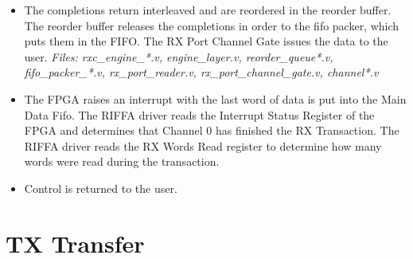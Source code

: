 \documentclass{refrep}
\begin{document}
\begin{itemize}
{     engine\_layer.v, txr\_engine\_*.v, tx\_multiplexer.v}
 \item The completions return interleaved and are reordered in the reorder
   buffer. The reorder buffer releases the completions in order to the fifo
   packer, which puts them in the FIFO. The RX Port Channel Gate issues the data
   to the user. \textit{Files: rxc\_engine\_*.v, engine\_layer.v, reorder\_queue*.v,
     fifo\_packer\_*.v, rx\_port\_reader.v, rx\_port\_channel\_gate.v, channel*.v}
\item The FPGA raises an interrupt with the last word of data is put into the
  Main Data Fifo. The RIFFA driver reads the Interrupt Status Register of the
  FPGA and determines that Channel 0 has finished the RX Transaction. The RIFFA
  driver reads the RX Words Read register to determine how many words were read
  during the transaction.
\item Control is returned to the user.
\end{itemize}
\section{TX Transfer}
\end{document}
